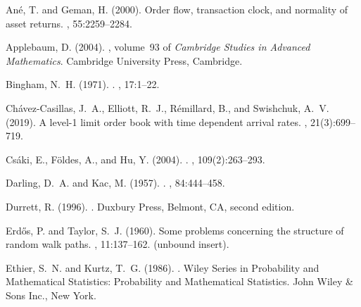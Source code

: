 \documentclass[final]{amsart}
\theoremstyle{definition}
\numberwithin{equation}{section}
\begin{document}
\def\cprime{$'$}
\begin{thebibliography}{}

Ané, T. and Geman, H. (2000).
\newblock Order flow, transaction clock, and normality of asset returns.
, 55:2259--2284.

Applebaum, D. (2004).
, volume~93 of {\em
  Cambridge Studies in Advanced Mathematics}.
\newblock Cambridge University Press, Cambridge.

Bingham, N.~H. (1971).
.
, 17:1--22.

Ch{\'a}vez-Casillas, J.~A., Elliott, R.~J., Rémillard, B., and Swishchuk,
  A.~V. (2019).
\newblock A level-1 limit order book with time dependent arrival rates.
, 21(3):699--719.

Cs\'{a}ki, E., F\"{o}ldes, A., and Hu, Y. (2004).
.
, 109(2):263--293.

Darling, D.~A. and Kac, M. (1957).
.
, 84:444--458.

Durrett, R. (1996).
.
\newblock Duxbury Press, Belmont, CA, second edition.

Erd\H{o}s, P. and Taylor, S.~J. (1960).
\newblock Some problems concerning the structure of random walk paths.
, 11:137--162. (unbound insert).

Ethier, S.~N. and Kurtz, T.~G. (1986).
.
\newblock Wiley Series in Probability and Mathematical Statistics: Probability
  and Mathematical Statistics. John Wiley \& Sons Inc., New York.


\end{thebibliography}
\end{document}
